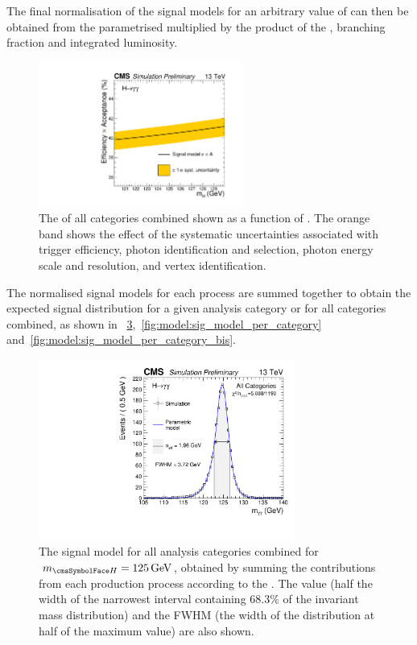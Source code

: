 \begin{figure}[ht!]
\label{fig:model:sig_interpolation_bis}
\end{figure}

The final normalisation of the signal models for an arbitrary value of \mH can then be obtained from the parametrised \effxacc multiplied by the product of the \crosssection, branching fraction and integrated luminosity. 

\begin{figure}[ht!]
\centering
\includegraphics[width=0.6\textwidth]{modellingFigures/effAcc_vs_mass.pdf} 
\caption{The \effxacc of all categories combined shown as a function of \mH. The orange band shows the effect of the systematic uncertainties associated with trigger efficiency, photon identification and selection, photon energy scale and resolution, and vertex identification.}

\label{fig:model:sig_effxacc}
\end{figure}

The normalised signal models for each process are summed together to obtain the expected signal \mgg distribution for a given analysis category or for all categories combined, as shown in \Fig\s~\ref{fig:model:sig_model_all},~\ref{fig:model:sig_model_per_category} and~\ref{fig:model:sig_model_per_category_bis}.
\begin{figure}[ht!]
\centering
\includegraphics[width=0.75\textwidth]{modellingFigures/DCBpG/all.pdf} 

\caption{The signal model for all analysis categories combined for $\mH=125\GeV$, obtained by summing the contributions from each production process according to the \effxacc. The \effSigma value (half the width of the narrowest interval containing 68.3\% of the invariant mass distribution) and the FWHM (the width of the distribution at half of the maximum value) are also shown. }

\label{fig:model:sig_model_all}
\end{figure}

